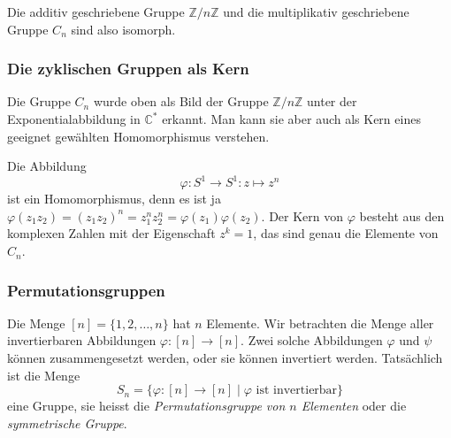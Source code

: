 Die additiv geschriebene Gruppe $\mathbb{Z}/n\mathbb{Z}$ und
die multiplikativ geschriebene Gruppe $C_n$ sind also isomorph.

%
%
\subsubsection{Die zyklischen Gruppen als Kern}
Die Gruppe $C_n$ wurde oben als Bild der Gruppe
$\mathbb{Z}/n\mathbb{Z}$ unter der Exponentialabbildung 
in $\mathbb{C}^*$ erkannt.
Man kann sie aber auch als Kern eines geeignet gewählten Homomorphismus
verstehen.

Die Abbildung
\[
\varphi
\colon
S^1\to S^1
:
z\mapsto z^n
\]
ist ein Homomorphismus, denn es ist ja $\varphi(z_1z_2)=(z_1z_2)^n
= z_1^nz_2^n=\varphi(z_1)\varphi(z_2)$.
Der Kern von $\varphi$ besteht aus den komplexen Zahlen mit der 
Eigenschaft $z^k=1$, das sind genau die Elemente von $C_n$.

%
%
\subsubsection{Permutationsgruppen}
Die Menge $[n]=\{1,2,\dots,n\}$ hat $n$ Elemente.
Wir betrachten die Menge aller invertierbaren Abbildungen
$\varphi\colon [n] \to [n]$.
Zwei solche Abbildungen $\varphi$ und $\psi$ können zusammengesetzt
werden, oder sie können invertiert werden.
Tatsächlich ist die Menge 
\[
S_n = \{\varphi\colon [n] \to [n]\mid \text{$\varphi$ ist invertierbar} \}
\]
eine Gruppe, sie heisst die {\em Permutationsgruppe von $n$ Elementen}
oder die {\em symmetrische Gruppe}.

